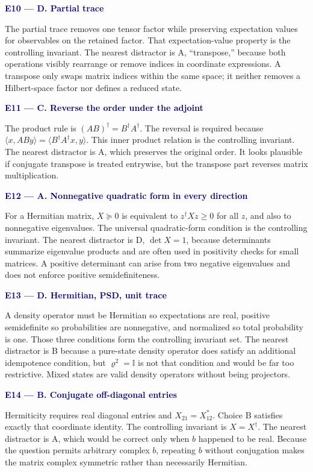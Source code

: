 \documentclass[10pt]{article}
\newcommand{\I}{\mathbb I}
\newcommand{\qhead}[2]{%
  \needspace{8\baselineskip}
  \par\medskip\noindent\textcolor{navy}{\textbf{#1. #2}}\par
}
\begin{document}
\qhead{E10 --- D}{Partial trace}

The partial trace removes one tensor factor while preserving expectation
values for observables on the retained factor.  That expectation-value
property is the controlling invariant.  The nearest distractor is A,
``transpose,'' because both operations visibly rearrange or remove indices
in coordinate expressions.  A transpose only swaps matrix indices within the
same space; it neither removes a Hilbert-space factor nor defines a reduced
state.

\qhead{E11 --- C}{Reverse the order under the adjoint}

The product rule is
\((AB)^\dagger=B^\dagger A^\dagger\).  The reversal is required because
\(\langle x,AB y\rangle=\langle B^\dagger A^\dagger x,y\rangle\).  This inner
product relation is the controlling invariant.  The nearest distractor is A,
which preserves the original order.  It looks plausible if conjugate
transpose is treated entrywise, but the transpose part reverses matrix
multiplication.

\qhead{E12 --- A}{Nonnegative quadratic form in every direction}

For a Hermitian matrix, \(X\succeq0\) is equivalent to
\(z^\dagger Xz\geq0\) for all \(z\), and also to nonnegative eigenvalues.  The
universal quadratic-form condition is the controlling invariant.  The nearest
distractor is D, \(\det X=1\), because determinants summarize eigenvalue
products and are often used in positivity checks for small matrices.  A
positive determinant can arise from two negative eigenvalues and does not
enforce positive semidefiniteness.

\qhead{E13 --- D}{Hermitian, PSD, unit trace}

A density operator must be Hermitian so expectations are real, positive
semidefinite so probabilities are nonnegative, and normalized so total
probability is one.  Those three conditions form the controlling invariant
set.  The nearest distractor is B because a pure-state density operator does
satisfy an additional idempotence condition, but \(\varrho^2=\I\) is not that
condition and would be far too restrictive.  Mixed states are valid density
operators without being projectors.

\qhead{E14 --- B}{Conjugate off-diagonal entries}

Hermiticity requires real diagonal entries and
\(X_{21}=X_{12}^\ast\).  Choice B satisfies exactly that coordinate identity.
The controlling invariant is \(X=X^\dagger\).  The nearest distractor is A,
which would be correct only when \(b\) happened to be real.  Because the
question permits arbitrary complex \(b\), repeating \(b\) without
conjugation makes the matrix complex symmetric rather than necessarily
Hermitian.
\end{document}

